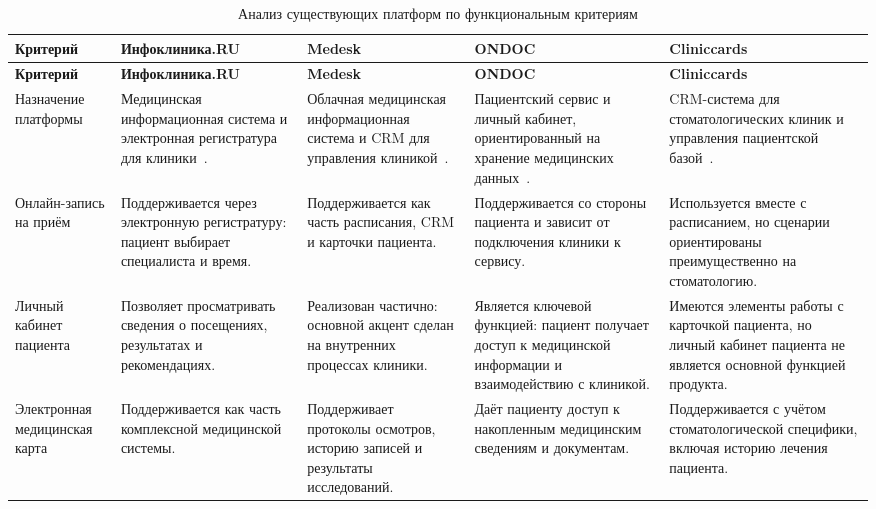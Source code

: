 {\scriptsize
\sloppy
\setlength{\LTcapwidth}{\textwidth}
\setlength{\tabcolsep}{2pt}
\renewcommand{\arraystretch}{1.12}
\begin{longtable}{|>{\raggedright\arraybackslash}p{}|>{\raggedright\arraybackslash}p{}|>{\raggedright\arraybackslash}p{}|>{\raggedright\arraybackslash}p{}|>{\raggedright\arraybackslash}p{}|}
\caption{Анализ существующих платформ по функциональным критериям}\label{tab:platform_analysis}\\
\hline
\textbf{Критерий} & \textbf{Инфоклиника.RU} & \textbf{Medesk} & \textbf{ONDOC} & \textbf{Cliniccards} \\ \hline
\endfirsthead
\tabcont{\ref{tab:platform_analysis}}
\textbf{Критерий} & \textbf{Инфоклиника.RU} & \textbf{Medesk} & \textbf{ONDOC} & \textbf{Cliniccards} \\ \hline
\endhead
Назначение платформы & Медицинская информационная система и электронная регистратура для клиники~\cite{infoclinica}. & Облачная медицинская информационная система и CRM для управления клиникой~\cite{medesk}. & Пациентский сервис и личный кабинет, ориентированный на хранение медицинских данных~\cite{ondoc}. & CRM-система для стоматологических клиник и управления пациентской базой~\cite{cliniccards}. \\ \hline
Онлайн-запись на приём & Поддерживается через электронную регистратуру: пациент выбирает специалиста и время. & Поддерживается как часть расписания, CRM и карточки пациента. & Поддерживается со стороны пациента и зависит от подключения клиники к сервису. & Используется вместе с расписанием, но сценарии ориентированы преимущественно на стоматологию. \\ \hline
Личный кабинет пациента & Позволяет просматривать сведения о посещениях, результатах и рекомендациях. & Реализован частично: основной акцент сделан на внутренних процессах клиники. & Является ключевой функцией: пациент получает доступ к медицинской информации и взаимодействию с клиникой. & Имеются элементы работы с карточкой пациента, но личный кабинет пациента не является основной функцией продукта. \\ \hline
Электронная медицинская карта & Поддерживается как часть комплексной медицинской системы. & Поддерживает протоколы осмотров, историю записей и результаты исследований. & Даёт пациенту доступ к накопленным медицинским сведениям и документам. & Поддерживается с учётом стоматологической специфики, включая историю лечения пациента. \\ \hline

\end{longtable}}
